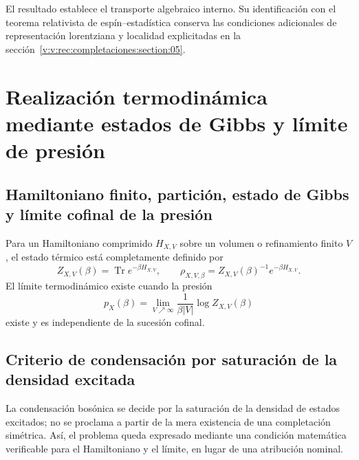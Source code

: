El resultado establece el transporte algebraico interno. Su identificación
con el teorema relativista de espín--estadística conserva las condiciones
adicionales de representación lorentziana y localidad explicitadas en la
sección~\ref{v:v:rec:completaciones:section:05}.

\clearpage
\section{Realización termodinámica mediante estados de Gibbs y límite de presión}
\label{v:v:rec:fock_gibbs:section:04}

\subsection{Hamiltoniano finito, partición, estado de Gibbs y límite cofinal de la presión}
\label{v:v:rec:fock_gibbs:section:05}

Para un Hamiltoniano comprimido \(H_{X,V}\) sobre un volumen o refinamiento
finito \(V\), el estado térmico está completamente definido por
\[
 Z_{X,V}(\beta)=\operatorname{Tr}e^{-\beta H_{X,V}},
 \qquad
 \rho_{X,V,\beta}=Z_{X,V}(\beta)^{-1}e^{-\beta H_{X,V}}.
\]
El límite termodinámico existe cuando la presión
\[
 p_X(\beta)=\lim_{V\nearrow\infty}
 \frac1{\beta |V|}\log Z_{X,V}(\beta)
\]
existe y es independiente de la sucesión cofinal.

\subsection{Criterio de condensación por saturación de la densidad excitada}
\label{v:v:rec:fock_gibbs:section:06}

La condensación bosónica se
decide por la saturación de la densidad de estados excitados; no se proclama a
partir de la mera existencia de una completación simétrica. Así, el problema
queda expresado mediante una condición matemática verificable para el
Hamiltoniano y el límite, en lugar de una atribución nominal.
